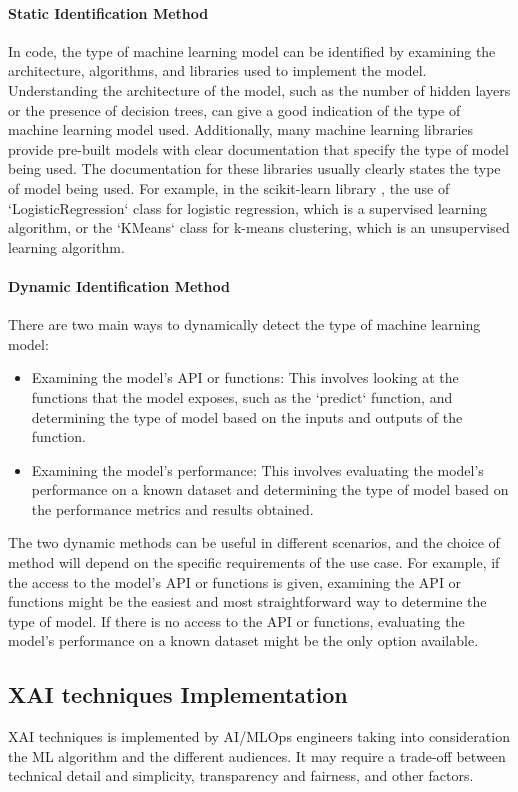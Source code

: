 \documentclass[conference]{IEEEtran}
\begin{document}
\paragraph{Static Identification Method} In code, the type of machine learning model can be identified by examining the architecture, algorithms, and libraries used to implement the model. Understanding the architecture of the model, such as the number of hidden layers or the presence of decision trees, can give a good indication of the type of machine learning model used. Additionally, many machine learning libraries provide pre-built models with clear documentation that specify the type of model being used. The documentation for these libraries usually clearly states the type of model being used. 
For example, in the scikit-learn library \cite{pedregosa2011scikit}, the use of `LogisticRegression` class for logistic regression, which is a supervised learning algorithm, or the `KMeans` class for k-means clustering, which is an unsupervised learning algorithm.
\paragraph{Dynamic Identification Method}There are two main ways to dynamically detect the type of machine learning model:

\begin{itemize}
	\item Examining the model's API or functions: This involves looking at the functions that the model exposes, such as the `predict` function, and determining the type of model based on the inputs and outputs of the function.

	\item Examining the model's performance: This involves evaluating the model's performance on a known dataset and determining the type of model based on the performance metrics and results obtained.
\end{itemize}

The two dynamic methods can be useful in different scenarios, and the choice of method will depend on the specific requirements of the use case. For example, if the access to the model's API or functions is given, examining the API or functions might be the easiest and most straightforward way to determine the type of model. If there is no access to the API or functions, evaluating the model's performance on a known dataset might be the only option available.

\subsection{XAI techniques Implementation}
XAI techniques is implemented by AI/MLOps engineers taking into consideration the ML algorithm and the different audiences. It may require a trade-off between technical detail and simplicity, transparency and fairness, and other factors.
\end{document}
